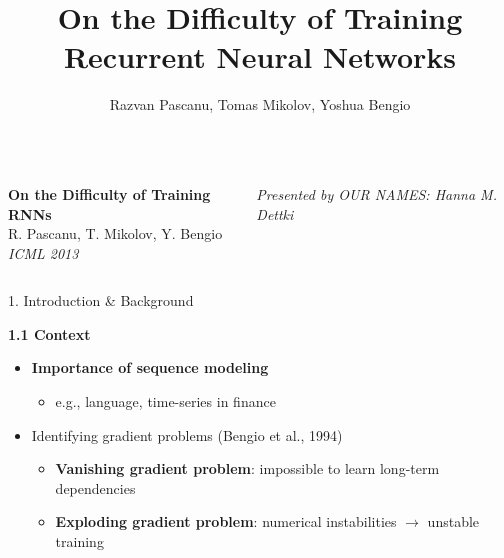 \documentclass[final]{beamer}
\title{On the Difficulty of Training Recurrent Neural Networks}
\author{Razvan Pascanu, Tomas Mikolov, Yoshua Bengio}
\institute{ICML 2013}
\begin{document}
\begin{frame}[t]
    \begin{columns}[t,totalwidth=\textwidth]
    \begin{column}{0.66\textwidth}
      \vspace{1em}
      {\centering
        {\veryHuge\bfseries On the Difficulty of Training RNNs}\\[0.5em]
        {\Huge R. Pascanu, T. Mikolov, Y. Bengio}\\[0.5em]
        {\Large\itshape ICML 2013}\\
      }
    \end{column}
    \begin{column}{0.33\textwidth}
      \flushright
      \Large \textit{Presented by OUR NAMES: Hanna M. Dettki}
    \end{column}
  \end{columns}
  \vspace{2em}

  \begin{columns}[t,totalwidth=\textwidth]

    \begin{column}{0.33\textwidth}
      \begin{block}{1. Introduction \& Background}

        \textbf{1.1 Context}
            \begin{itemize}
            \item \textbf{Importance of sequence modeling}
            \begin{itemize}
                \item e.g., language, time-series in finance
            \end{itemize}

            \item Identifying gradient problems (Bengio et al., 1994)
            \begin{itemize}
                \item \textbf{Vanishing gradient problem}: impossible to learn long-term dependencies
                \item \textbf{Exploding gradient problem}: numerical instabilities $\rightarrow$ unstable training
            \end{itemize}


\end{itemize}
\end{block}
\end{column}
\end{columns}
\end{frame}
\end{document}
